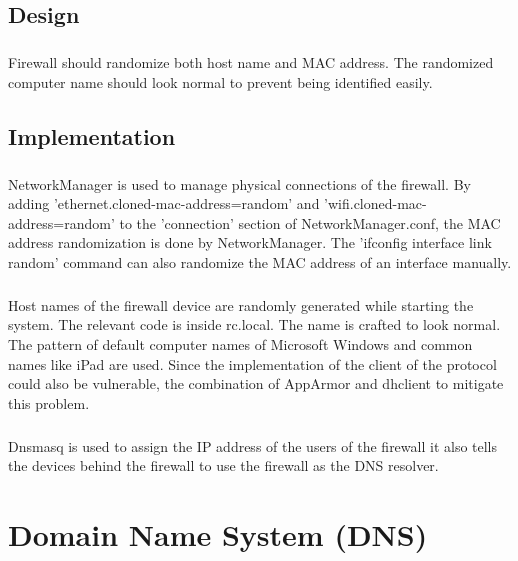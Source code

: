 \documentclass[mscthesis]{usiinfthesis}
\begin{document}
\section{Design}
\paragraph{}
Firewall should randomize both host name and MAC address. The randomized computer name should look normal to prevent being identified easily.


\section{Implementation}
\paragraph{}
NetworkManager is used to manage physical connections of the firewall. By adding 'ethernet.cloned-mac-address=random' and 'wifi.cloned-mac-address=random' to the 'connection' section of NetworkManager.conf, the MAC address randomization is done by NetworkManager. The 'ifconfig interface link random' command can also randomize the MAC address of an interface manually.
\paragraph{}
Host names of the firewall device are randomly generated while starting the system. The relevant code is inside rc.local. The name is crafted to look normal. The pattern of default computer names of Microsoft Windows and common names like iPad are used. Since the implementation of the client of the protocol could also be vulnerable, the combination of AppArmor and dhclient to mitigate this problem.
\paragraph{}
Dnsmasq is used to assign the IP address of the users of the firewall it also tells the devices behind the firewall to use the firewall as the DNS resolver.

\chapter{Domain Name System (DNS)}
\end{document}
